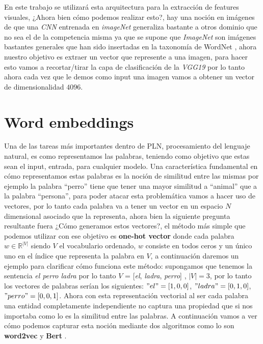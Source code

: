 En este trabajo se utilizará esta arquitectura para la extracción de features visuales, ¿Ahora bien cómo podemos realizar esto?, hay una noción en imágenes de que una \textit{CNN} entrenada en \textit{imageNet} generaliza bastante a otros dominio que no sea el de la competencia misma ya que se supone que \textit{ImageNet} son imágenes bastantes generales que han sido insertadas en la taxonomía de WordNet \cite{worNet}, ahora nuestro objetivo es extraer un vector que represente a una imagen, para hacer esto vamos a recortar/tirar la capa de clasificación de la \textit{VGG19} por lo tanto ahora cada vez que le demos como input una imagen vamos a obtener un vector de dimensionalidad $4096$.

\section{Word embeddings}

Una de las tareas más importantes dentro de PLN, procesamiento del lenguaje natural, es como representamos las palabras, teniendo como objetivo que estas sean el input, entrada, para cualquier modelo. Una característica fundamental en cómo representamos estas palabras es la noción de similitud entre las mismas por ejemplo la palabra “perro” tiene que tener una mayor similitud a “animal” que a la palabra “persona”, para poder atacar esta problemática vamos a hacer uso de vectores, por lo tanto cada palabra va a tener un vector en un espacio $N$ dimensional asociado que la representa, ahora bien la siguiente pregunta resultante fuera ¿Cómo generamos estos vectores?, el método más simple que podemos utilizar con ese objetivo es \textbf{one-hot vector} donde cada palabra $w \in \mathbb{R}^{|V|}$ siendo $V$ el vocabulario ordenado, $w$ consiste en todos ceros y un único uno en el índice que representa la palabra en $V$, a continuación daremos un ejemplo para clarificar cómo funciona este método: supongamos que tenemos la sentencia \textit{el perro ladra} por lo tanto $V$ = [\textit{el}, \textit{ladra}, \textit{perro}] , $|V| = 3$,  por lo tanto los vectores de palabras serían los siguientes: $"el" = [1, 0, 0]$, $"ladra" = [0, 1, 0]$, $"perro" = [0, 0, 1]$. Ahora con esta representación vectorial al ser cada palabra una entidad completamente independiente no captura una propiedad que si nos importaba como lo es la similitud entre las palabras.
A continuación vamos a ver cómo podemos capturar esta noción mediante dos algoritmos como lo son \textbf{word2vec} \cite{mikolov2013efficient} y \textbf{Bert} \cite{devlin2018bert}.

